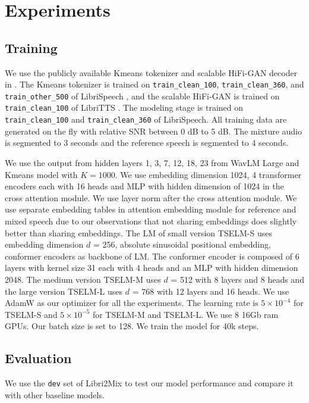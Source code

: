 \documentclass[conference]{IEEEtran}
\begin{document}
\section{Experiments}


  
\subsection{Training}

We use the publicly available Kmeans tokenizer and scalable 
HiFi-GAN decoder in \cite{speechbrain}. The Kmeans tokenizer
is trained on \texttt{train\_clean\_100}, \texttt{train\_clean\_360}, and \texttt{train\_other\_500} of
LibriSpeech \cite{librispeech}, and the scalable HiFi-GAN is trained on \texttt{train\_clean\_100} of 
LibriTTS \cite{libritts}. The modeling stage is trained on 
\texttt{train\_clean\_100} and \texttt{train\_clean\_360} of LibriSpeech. All training data are 
generated on the fly with relative SNR between 0 dB to 5 dB. The mixture audio is segmented to 3 
seconds and the reference speech is segmented to 4 seconds. 

We use the output from hidden layers 1, 3, 7, 12, 18, 23 from WavLM Large and Kmeans model with 
\(K=1000\).
We use embedding dimension 1024,  4 transformer 
encoders each with 16 heads and MLP with hidden dimension of 1024 in the cross attention module. We 
use layer norm after the cross attention module. 
We use separate embedding tables in attention embedding module for reference and mixed speech due to our observations that not 
sharing embeddings does slightly better than sharing embeddings. The LM of small version TSELM-S uses 
embedding dimension \(d\) = 256, absolute sinusoidal positional embedding, conformer encoders as backbone of LM. The conformer encoder is composed of 
6 layers with kernel size 31 each with 4 heads and an MLP with hidden dimension 2048. The medium version TSELM-M uses \(d\) = 512 with 8 layers and 8 heads and the large version TSELM-L uses 
\(d\) = 768 with 12 layers and 16 heads. We use AdamW as 
our optimizer for all the experiments. The learning rate 
is \(5 \times 10^{-4}\) for TSELM-S and \(5 \times 10^{-5}\) for TSELM-M and TSELM-L. We use 8 16Gb ram GPUs. Our batch size is set to 128. We train the model for 40k steps. 


\subsection{Evaluation}
We use the \texttt{dev} set of Libri2Mix \cite{librimix} to test our model performance and compare it with 
other baseline models. 
\end{document}
